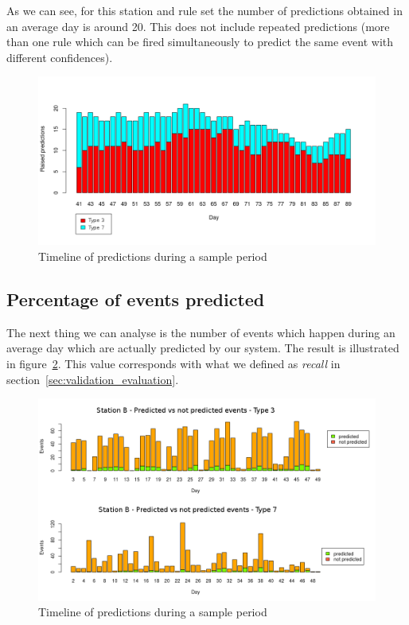 As we can see, for this station and rule set the number of predictions obtained in an average day is around 20. This does not include repeated predictions (more than one rule which can be fired simultaneously to predict the same event with different confidences).

\begin{figure}[hbtp]
\includegraphics[width=\textwidth]{img/scenario_pred_categories.png}
\caption{Timeline of predictions during a sample period} \label{fig:scenario_pred_categories}
\end{figure}

\subsection{Percentage of events predicted}
The next thing we can analyse is the number of events which happen during an average day which are actually predicted by our system. The result is illustrated in figure~\ref{fig:scenario_pred_notpred}. This value corresponds with what we defined as \emph{recall} in section~\ref{sec:validation_evaluation}.

\begin{figure}[hbtp]
\includegraphics[width=\textwidth]{img/scenario_pred_notpred.png}
\caption{Timeline of predictions during a sample period} \label{fig:scenario_pred_notpred}
\end{figure}

